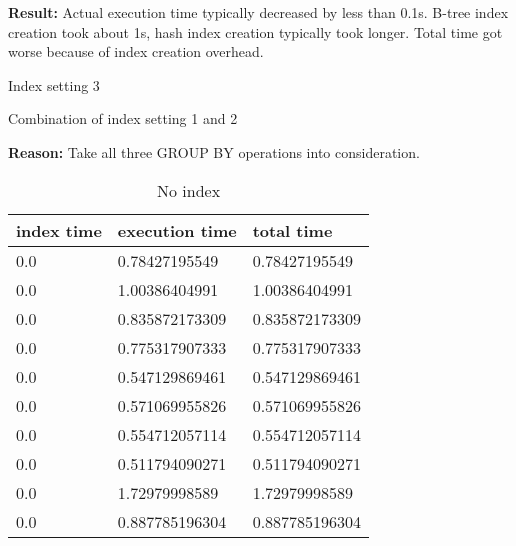 \begin{itemize*}
\par \textbf{Result:} Actual execution time typically decreased by less than 0.1s. B-tree index creation took about 1s, hash index creation typically took longer. Total time got worse because of index creation overhead.
\item{Index setting 3}
\par Combination of index setting 1 and 2
\par \textbf{Reason:} Take all three GROUP BY operations into consideration.

\begin{table}[H]
\begin{center}
\begin{tabular}{|l|l|l|}
\hline
index time & execution time & total time     \\ \hline
0.0 & 0.78427195549  & 0.78427195549  \\ \hline
0.0 & 1.00386404991  & 1.00386404991  \\ \hline
0.0 & 0.835872173309 & 0.835872173309 \\ \hline
0.0 & 0.775317907333 & 0.775317907333 \\ \hline
0.0 & 0.547129869461 & 0.547129869461 \\ \hline
0.0 & 0.571069955826 & 0.571069955826 \\ \hline
0.0 & 0.554712057114 & 0.554712057114 \\ \hline
0.0 & 0.511794090271 & 0.511794090271 \\ \hline
0.0 & 1.72979998589  & 1.72979998589  \\ \hline
0.0 & 0.887785196304 & 0.887785196304 \\ \hline
\end{tabular}
\end{center}
\caption{No index}
\end{table}


\end{itemize*}
